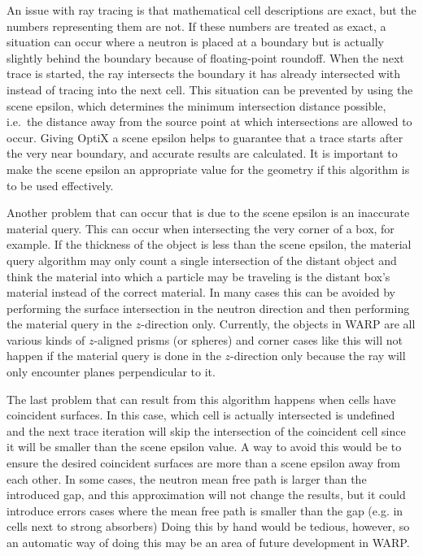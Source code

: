 An issue with ray tracing is that mathematical cell descriptions are exact, but the numbers representing them are not. If these numbers are treated as exact, a situation can occur where a neutron is placed at a boundary but is actually slightly behind the boundary because of floating-point roundoff.  When the next trace is started, the ray intersects the boundary it has already intersected with instead of tracing into the next cell.  This situation can be prevented by using the scene epsilon, which determines the minimum intersection distance possible, i.e.\ the distance away from the source point at which intersections are allowed to occur.  Giving OptiX a scene epsilon helps to guarantee that a trace starts after the very near boundary, and accurate results are calculated.  It is important to make the scene epsilon an appropriate value for the geometry if this algorithm is to be used effectively. 

Another problem that can occur that is due to the scene epsilon is an inaccurate material query.  This can occur when intersecting the very corner of a box, for example. If the thickness of the object is less than the scene epsilon, the material query algorithm may only count a single intersection of the distant object and think the material into which a particle may be traveling is the distant box's material instead of the correct material.  In many cases this can be avoided by performing the surface intersection in the neutron direction and then performing the material query in the $z$-direction only.  Currently, the objects in WARP are all various kinds of $z$-aligned prisms (or spheres) and corner cases like this will not happen if the material query is done in the $z$-direction only because the ray will only encounter planes perpendicular to it.  %

The last problem that can result from this algorithm happens when cells have coincident surfaces.  In this case, which cell is actually intersected is undefined and the next trace iteration will skip the intersection of the coincident cell since it will be smaller than the scene epsilon value.  A way to avoid this would be to ensure the desired coincident surfaces are more than a scene epsilon away from each other.  In some cases, the neutron mean free path is larger than the introduced gap, and this approximation will not change the results, but it could introduce errors cases where the mean free path is smaller than the gap (e.g. in cells next to strong absorbers) %
 Doing this by hand would be tedious, however, so an automatic way of doing this may be an area of future development in WARP.


